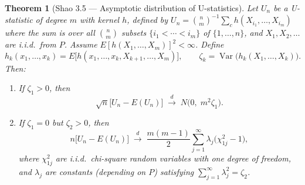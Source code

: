 \documentclass{article}
\newtheorem{theorem}{Theorem}
\begin{document}

\begin{theorem}[Shao 3.5 — Asymptotic distribution of U-statistics]
\label{thm:shao-3-5}
Let $U_n$ be a U-statistic of degree $m$ with kernel $h$, defined by
$U_n = \binom{n}{m}^{-1} \sum_{c} h(X_{i_1}, \ldots, X_{i_m})$
where the sum is over all $\binom{n}{m}$ subsets $\{i_1 < \cdots < i_m\}$ of $\{1,\ldots,n\}$,
and $X_1, X_2, \ldots$ are i.i.d.\ from $P$.  Assume $E[h(X_1, \ldots, X_m)]^2 < \infty$.
Define
\[
  h_k(x_1, \ldots, x_k) = E\bigl[ h(x_1, \ldots, x_k, X_{k+1}, \ldots, X_m) \bigr],
  \qquad
  \zeta_k = \operatorname{Var}\bigl( h_k(X_1, \ldots, X_k) \bigr).
\]
Then:
\begin{enumerate}
\item[(i)] If $\zeta_1 > 0$, then
\[
  \sqrt{n}\bigl[ U_n - E(U_n) \bigr] \;\xrightarrow{d}\; N\bigl( 0,\; m^2 \zeta_1 \bigr).
\]
\item[(ii)] If $\zeta_1 = 0$ but $\zeta_2 > 0$, then
\[
  n\bigl[ U_n - E(U_n) \bigr] \;\xrightarrow{d}\; \frac{m(m-1)}{2} \sum_{j=1}^{\infty} \lambda_j \bigl( \chi^2_{1j} - 1 \bigr),
\]
where $\chi^2_{1j}$ are i.i.d.\ chi-square random variables with one degree of freedom,
and $\lambda_j$ are constants (depending on $P$) satisfying $\sum_{j=1}^{\infty} \lambda_j^2 = \zeta_2$.
\end{enumerate}
\end{theorem}
\end{document}
